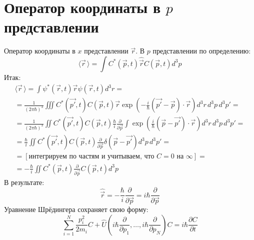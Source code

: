 \section{Оператор координаты в $p$ представлении}
Оператор координаты в $x$ представлении $\vec{r}$. В $p$ представлении по определению:
\[
	\langle \vec{r}\,\rangle = \int C^*(\vec{p}, t) \hat{\vec{r}} C(\vec{p}, t) d^3p	
\]
Итак:
\[
	\begin{gathered}
	\langle \vec{r}\,\rangle = \int \psi^*(\vec{r}, t) \vec{r} \psi(\vec{r}, t) d^3 r = \\ =
	\frac{1}{(2\pi\hbar)^{3}} \iiint C^*(\vec{p'}, t) C(\vec{p}, t) \vec{r} 
	\exp 
	\left(
		-\frac{i}{\hbar}
			(\vec{p'} - \vec{p})\cdot \vec{r}
	\right) d^3r\,d^3p\,d^3p' =
	\\ =
	\frac{1}{(2\pi\hbar)^{3}} \iint C^*(\vec{p'}, t) C(\vec{p}, t)
	\frac{\hbar}{i}
	\frac{\partial}{\partial \vec{p}}
	\int
	\exp 
	\left(
		\frac{i}{\hbar}
		(\vec{p} - \vec{p'})\cdot \vec{r}
	\right) d^3r\,d^3p\,d^3p' = 
	\\ =
	\frac{\hbar}{i}\iint C^*(\vec{p'}, t) C(\vec{p}, t)
	\frac{\partial}{\partial \vec{p}}
	\delta(\vec{p} - \vec{p'}) d^3p\, d^3p'
	= \\ =
	[\text{интегрируем по частям и учитываем, что $C = 0$ на $\infty$}] = \\ =
	-\frac{\hbar}{i}
	\iint 
	C^*(\vec{p}, t)
	\frac{\partial}{\partial \vec{p}}
	C(\vec{p}, t)
	d^3p
	\end{gathered}
\]
В результате:
\[
	\hat{\vec{r}} = 
	-\frac{\hbar}{i} \frac{\partial}{\partial \vec{p}} =
	i\hbar \frac{\partial}{\partial \vec{p}} 
\]
Уравнение Шрёдингера сохраняет свою форму:
\[
	\sum_{i=1}^N\frac{p_i^2}{2m_i} C + \hat{U}\left(i \hbar \frac{\partial}{\partial p_1}, \ldots, i \hbar \frac{\partial}{\partial p_N}\right) C = i\hbar \frac{\partial C}{\partial t}
\]